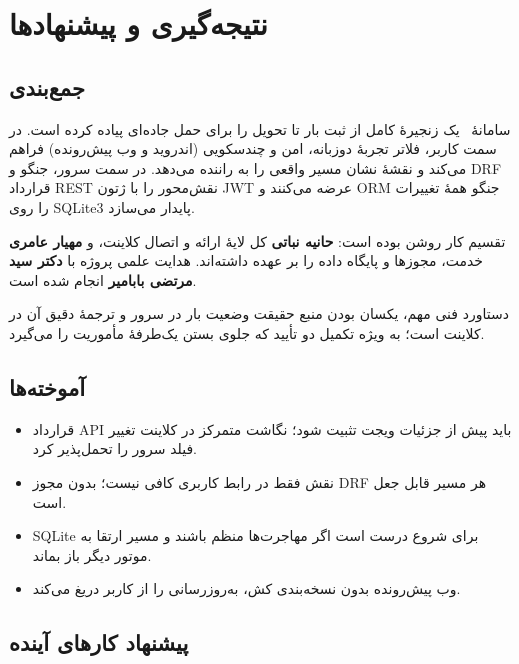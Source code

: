 \chapter[نتیجه‌گیری]{نتیجه‌گیری و پیشنهادها}
\enlargethispage{5\baselineskip}

\section{جمع‌بندی}

سامانهٔ \appname\ یک زنجیرهٔ کامل از ثبت بار تا تحویل را برای حمل جاده‌ای پیاده کرده است. در سمت کاربر، فلاتر تجربهٔ دوزبانه، امن و چندسکویی (اندروید و وب پیش‌رونده) فراهم می‌کند و نقشهٔ نشان مسیر واقعی را به راننده می‌دهد. در سمت سرور، جنگو و \textenglish{DRF} قرارداد \textenglish{REST} نقش‌محور را با ژتون \textenglish{JWT} عرضه می‌کنند و \textenglish{ORM} جنگو همهٔ تغییرات را روی \textenglish{SQLite3} پایدار می‌سازد.

تقسیم کار روشن بوده است: \textbf{حانیه نباتی} کل لایهٔ ارائه و اتصال کلاینت، و \textbf{مهیار عامری} خدمت، مجوزها و پایگاه داده را بر عهده داشته‌اند. هدایت علمی پروژه با \textbf{دکتر سید مرتضی بابامیر} انجام شده است.

دستاورد فنی مهم، یکسان بودن منبع حقیقت وضعیت بار در سرور و ترجمهٔ دقیق آن در کلاینت است؛ به ویژه تکمیل دو تأیید که جلوی بستن یک‌طرفهٔ مأموریت را می‌گیرد.

\section{آموخته‌ها}

\begin{itemize}
  \item قرارداد \textenglish{API} باید پیش از جزئیات ویجت تثبیت شود؛ نگاشت متمرکز در کلاینت تغییر فیلد سرور را تحمل‌پذیر کرد.
  \item نقش فقط در رابط کاربری کافی نیست؛ بدون مجوز \textenglish{DRF} هر مسیر قابل جعل است.
  \item \textenglish{SQLite} برای شروع درست است اگر مهاجرت‌ها منظم باشند و مسیر ارتقا به موتور دیگر باز بماند.
  \item وب پیش‌رونده بدون نسخه‌بندی کش، به‌روزرسانی را از کاربر دریغ می‌کند.
\end{itemize}

\section{پیشنهاد کارهای آینده}

